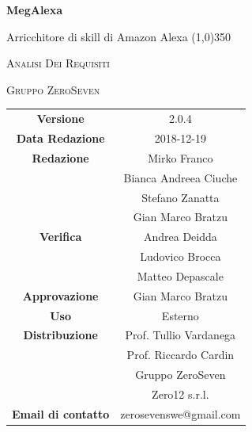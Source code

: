 \documentclass[a4paper,12pt,openany]{book}
\author{Ludovico Brocca}
\date{2018-12-19}
\begin{document}
\begin{titlepage}
	\centering
	{\huge\bfseries MegAlexa \par}
	Arricchitore di skill di Amazon Alexa
	\line(1,0){350} \\
	{\scshape\LARGE Analisi Dei Requisiti \par}
	\vspace{1cm}
	{\scshape Gruppo ZeroSeven \par}
	\logo
	\begin{tabular}{c|c}
		{\hfill \textbf{Versione}} 			& 2.0.4			\\
		{\hfill\textbf{Data Redazione}} 	& 2018-12-19		\\ 
		{\hfill\textbf{Redazione}} 			&  		Mirko Franco \\ & Bianca Andreea Ciuche \\&Stefano Zanatta\\&Gian Marco Bratzu \\
		{\hfill\textbf{Verifica}} 				&  	Andrea Deidda  \\ & Ludovico Brocca\\& Matteo Depascale\\
		{\hfill\textbf{Approvazione}} 		&  	Gian Marco Bratzu		\\ 
		{\hfill\textbf{Uso}} 					& 		Esterno		\\ 
		{\hfill\textbf{Distribuzione}} 			& 			Prof. Tullio Vardanega \\ & Prof. Riccardo Cardin \\ & Gruppo ZeroSeven	\\ & Zero12 s.r.l. \\
		{\hfill\textbf{Email di contatto}} & zerosevenswe@gmail.com \\
	\end{tabular}
\end{titlepage}
	
	\label{LastFrontPage}
	\newpage	
	
	\pagestyle{mymain}
	\tableofcontents
	\listoffigures
	\listoftables
	
	
	
	
	
	\label{LastPage}
\end{document}
